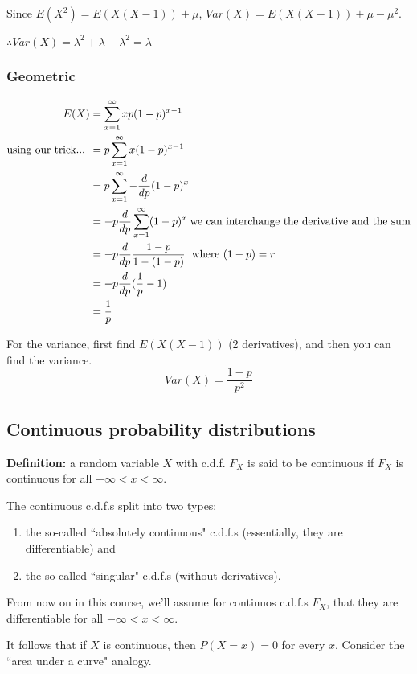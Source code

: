 \documentclass[12pt]{article}
\begin{document}
Since $E(X^2) = E(X(X-1)) + \mu$, $Var(X) = E(X(X-1)) + \mu - \mu^2$. 

$\therefore Var(X) = \lambda^2 + \lambda - \lambda^2 = \lambda$


\subsubsection{Geometric}

\begin{align*}
    E(X) &= \sum_{x=1}^{\infty} x p (1-p)^{x-1} \\
    \textnormal{using our trick... }   &=  p \sum_{x=1}^{\infty} x (1-p)^{x-1} \\
        &= p \sum_{x=1}^{\infty} - \frac{d}{dp} (1-p)^{x} \\
        &= -p \frac{d}{dp} \sum_{x=1}^{\infty} (1-p)^{x} \; \textnormal{we can interchange the derivative and the sum} \\
        &= -p \frac{d}{dp} \frac{1-p}{1-(1-p)} \; \textnormal{ where } (1-p) = r \\
        &= -p \frac{d}{dp} (\frac{1}{p} - 1) \\
        &= \frac{1}{p}
\end{align*}

For the variance, first find $E(X(X-1))$ (2 derivatives), and then you can find the variance.
\[
    Var(X) = \frac{1-p}{p^2}
\]

\subsection{Continuous probability distributions}
\textbf{Definition:} a random variable $X$ with c.d.f. $F_X$ is said to be continuous if $F_X$ is continuous for all $- \infty < x < \infty$.

The continuous c.d.f.s split into two types:
\begin{enumerate}
    \item the so-called ``absolutely continuous" c.d.f.s (essentially, they are differentiable) and
    \item the so-called ``singular" c.d.f.s (without derivatives).
\end{enumerate}

From now on in this course, we'll assume for continuos c.d.f.s $F_X$, that they are differentiable for all $- \infty < x < \infty$.

It follows that if $X$ is continuous, then $P(X=x)=0$ for every $x$. Consider the ``area under a curve" analogy.
\end{document}
